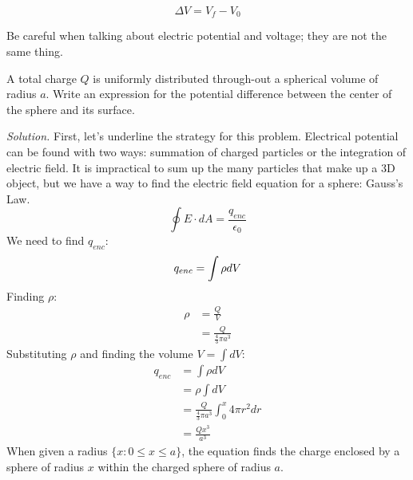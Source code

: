 \documentclass[12pt, titlepage]{article}
\begin{document}
\[\Delta V = V_f - V_0\]

Be careful when talking about electric potential and voltage; they are not the same thing.

\begin{Problem}
    A total charge $Q$ is uniformly distributed through-out a spherical volume of radius $a$. Write an expression for the potential difference between the center of the sphere and its surface.

    \tcblower

    \textit{Solution. } First, let's underline the strategy for this problem. Electrical potential can be found with two ways: summation of charged particles or the integration of electric field. It is impractical to sum up the many particles that make up a 3D object, but we have a way to find the electric field equation for a sphere: Gauss's Law.
    \begin{equation*}
        \oint E \cdot dA = \frac{q_{enc}}{\epsilon_0}
    \end{equation*}
    We need to find $q_{enc}$:
    \begin{equation*}
        q_{enc}=\int \rho dV \newline
    \end{equation*} 
    Finding $\rho$:
    \begin{equation*}
        \begin{split}
            \rho & = \frac{Q}{V} \\
            &=\frac{Q}{\frac{4}{3} \pi a^3}
        \end{split}  
    \end{equation*}
    Substituting $\rho$ and finding the volume $V = \int dV$:
    \begin{equation*}
        \begin{split}
            q_{enc} &=\int \rho dV \\
            &=\rho \int dV \\
            &=\frac{Q}{\frac{4}{3} \pi a^3} \int_{0}^{x}4 \pi r^2 dr \\ 
            &=\frac{Qx^3}{a^3}
        \end{split}  
    \end{equation*}
    When given a radius $\{ x: 0 \leq x \leq a\}$, the equation finds the charge enclosed by a sphere of radius $x$ within the charged sphere of radius $a$.


\end{Problem}
\end{document}
